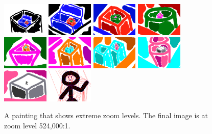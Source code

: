 \documentclass[review]{acmsiggraph}
\begin{document}
\begin{figure}
    \centering
        \includegraphics[width=0.195\textwidth]{images/zoom61}
        \includegraphics[width=0.195\textwidth]{images/zoom62}
        \includegraphics[width=0.195\textwidth]{images/zoom63}
        \includegraphics[width=0.195\textwidth]{images/zoom64}
        \includegraphics[width=0.195\textwidth]{images/zoom65}
        \includegraphics[width=0.195\textwidth]{images/zoom66}
        \includegraphics[width=0.195\textwidth]{images/zoom67}
        \includegraphics[width=0.195\textwidth]{images/zoom68}
        \includegraphics[width=0.195\textwidth]{images/zoom69}
        \includegraphics[width=0.195\textwidth]{images/zoom72}
    \caption{A painting that shows extreme zoom levels.  The final image is at zoom level 524,000:1.}
    \label{fig:boxes}
\end{figure}
\end{document}

